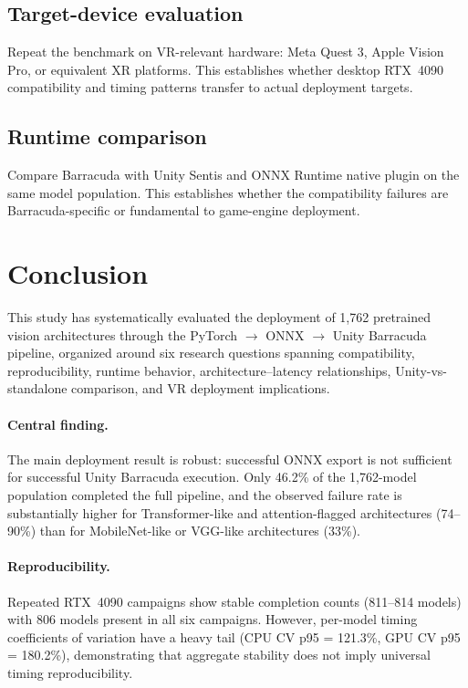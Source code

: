 \documentclass[10pt,twocolumn,letterpaper]{article}
\begin{document}
\subsection{Target-device evaluation}

Repeat the benchmark on VR-relevant hardware: Meta Quest 3, Apple Vision Pro, or equivalent XR platforms. This establishes whether desktop RTX~4090 compatibility and timing patterns transfer to actual deployment targets.

\subsection{Runtime comparison}

Compare Barracuda with Unity Sentis and ONNX Runtime native plugin on the same model population. This establishes whether the compatibility failures are Barracuda-specific or fundamental to game-engine deployment.

\section{Conclusion}\label{sec:conclusion}

This study has systematically evaluated the deployment of 1,762 pretrained vision architectures through the PyTorch $\rightarrow$ ONNX $\rightarrow$ Unity Barracuda pipeline, organized around six research questions spanning compatibility, reproducibility, runtime behavior, architecture--latency relationships, Unity-vs-standalone comparison, and VR deployment implications.

\paragraph{Central finding.}
The main deployment result is robust: successful ONNX export is not sufficient for successful Unity Barracuda execution. Only 46.2\% of the 1,762-model population completed the full pipeline, and the observed failure rate is substantially higher for Transformer-like and attention-flagged architectures (74--90\%) than for MobileNet-like or VGG-like architectures (33\%).

\paragraph{Reproducibility.}
Repeated RTX~4090 campaigns show stable completion counts (811--814 models) with 806 models present in all six campaigns. However, per-model timing coefficients of variation have a heavy tail (CPU CV p95 = 121.3\%, GPU CV p95 = 180.2\%), demonstrating that aggregate stability does not imply universal timing reproducibility.
\end{document}
